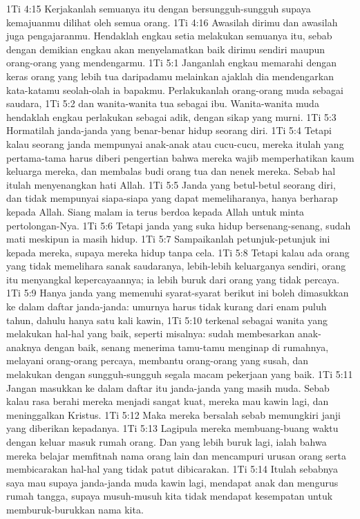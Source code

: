 1Ti 4:15  Kerjakanlah semuanya itu dengan bersungguh-sungguh supaya kemajuanmu dilihat oleh semua orang.
1Ti 4:16  Awasilah dirimu dan awasilah juga pengajaranmu. Hendaklah engkau setia melakukan semuanya itu, sebab dengan demikian engkau akan menyelamatkan baik dirimu sendiri maupun orang-orang yang mendengarmu.
1Ti 5:1  Janganlah engkau memarahi dengan keras orang yang lebih tua daripadamu melainkan ajaklah dia mendengarkan kata-katamu seolah-olah ia bapakmu. Perlakukanlah orang-orang muda sebagai saudara,
1Ti 5:2  dan wanita-wanita tua sebagai ibu. Wanita-wanita muda hendaklah engkau perlakukan sebagai adik, dengan sikap yang murni.
1Ti 5:3  Hormatilah janda-janda yang benar-benar hidup seorang diri.
1Ti 5:4  Tetapi kalau seorang janda mempunyai anak-anak atau cucu-cucu, mereka itulah yang pertama-tama harus diberi pengertian bahwa mereka wajib memperhatikan kaum keluarga mereka, dan membalas budi orang tua dan nenek mereka. Sebab hal itulah menyenangkan hati Allah.
1Ti 5:5  Janda yang betul-betul seorang diri, dan tidak mempunyai siapa-siapa yang dapat memeliharanya, hanya berharap kepada Allah. Siang malam ia terus berdoa kepada Allah untuk minta pertolongan-Nya.
1Ti 5:6  Tetapi janda yang suka hidup bersenang-senang, sudah mati meskipun ia masih hidup.
1Ti 5:7  Sampaikanlah petunjuk-petunjuk ini kepada mereka, supaya mereka hidup tanpa cela.
1Ti 5:8  Tetapi kalau ada orang yang tidak memelihara sanak saudaranya, lebih-lebih keluarganya sendiri, orang itu menyangkal kepercayaannya; ia lebih buruk dari orang yang tidak percaya.
1Ti 5:9  Hanya janda yang memenuhi syarat-syarat berikut ini boleh dimasukkan ke dalam daftar janda-janda: umurnya harus tidak kurang dari enam puluh tahun, dahulu hanya satu kali kawin,
1Ti 5:10  terkenal sebagai wanita yang melakukan hal-hal yang baik, seperti misalnya: sudah membesarkan anak-anaknya dengan baik, senang menerima tamu-tamu menginap di rumahnya, melayani orang-orang percaya, membantu orang-orang yang susah, dan melakukan dengan sungguh-sungguh segala macam pekerjaan yang baik.
1Ti 5:11  Jangan masukkan ke dalam daftar itu janda-janda yang masih muda. Sebab kalau rasa berahi mereka menjadi sangat kuat, mereka mau kawin lagi, dan meninggalkan Kristus.
1Ti 5:12  Maka mereka bersalah sebab memungkiri janji yang diberikan kepadanya.
1Ti 5:13  Lagipula mereka membuang-buang waktu dengan keluar masuk rumah orang. Dan yang lebih buruk lagi, ialah bahwa mereka belajar memfitnah nama orang lain dan mencampuri urusan orang serta membicarakan hal-hal yang tidak patut dibicarakan.
1Ti 5:14  Itulah sebabnya saya mau supaya janda-janda muda kawin lagi, mendapat anak dan mengurus rumah tangga, supaya musuh-musuh kita tidak mendapat kesempatan untuk memburuk-burukkan nama kita.
